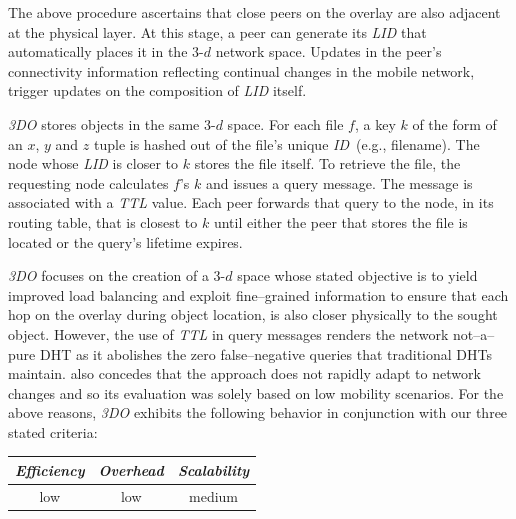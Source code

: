 The above procedure ascertains that close peers on the
overlay are also adjacent at the physical layer. 
At this stage, a peer can generate its \emph{LID}
that automatically places it in the $3$-$d$ network space.
Updates in the peer's connectivity information 
reflecting continual changes in the mobile network,
trigger updates on the composition of \emph{LID} itself.

\emph{3DO} stores objects in the same $3$-$d$ space. For each
file $f$, a key $k$ of the form of an $x$, $y$ and $z$ tuple
is hashed out of the file's unique \emph{ID}~(e.g., filename).
The node whose \emph{LID} is closer to $k$ stores the
file itself.
To retrieve the file, the requesting node calculates $f$'s $k$
and issues a query message. 
The message is associated with a \emph{TTL} value. 
Each peer forwards that query to the node,
in its routing table, that is closest to $k$ until either the peer
that stores the file is located or the query's lifetime expires.

\emph{3DO} focuses on
the creation of a $3$-$d$ space whose stated objective is to
yield improved load balancing 
and exploit fine--grained information to ensure
that each hop on the overlay during object location, 
is also closer physically to the sought object.
However, the use of \emph{TTL} in query messages
renders the network not--a--pure DHT as it abolishes 
the zero false--negative queries that traditional DHTs maintain.
\cite{AOS2014} also concedes that the approach
does not rapidly adapt to network changes and so
its evaluation was solely based on low mobility scenarios. 
For the above reasons, \emph{3DO} exhibits the following behavior 
in conjunction with our three stated criteria:
\begin{center}
{\footnotesize
\begin{tabular}{ccc}
\emph{Efficiency} & \emph{Overhead} & \emph{Scalability} \\
\hline
% 
low &
% 
low &
% 
medium
\end{tabular}
}
\end{center}


